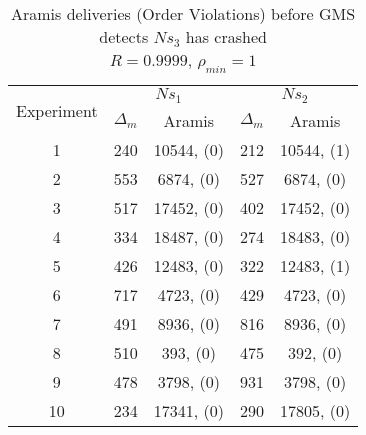 \begin{table}[p]
    \begin{center}
        \renewcommand{\arraystretch}{1.25}
        \begin{tabular}{|c|c|c|c|c|}
            \hline
            \multirow{2}{*}{Experiment} & \multicolumn{2}{|c|}{$Ns_1$} & \multicolumn{2}{|c|}{$Ns_2$} \\ \cline{2-5}
                                                       & $\Delta_m$&\textsf{Aramis} & $\Delta_m$&\textsf{Aramis} \\ \hline \hline
            1 & 240 & 10544, (0) & 212 & 10544, (1) \\ \hline
            2 & 553 & 6874, (0) & 527 & 6874, (0) \\ \hline
            3 & 517 & 17452, (0) & 402 & 17452, (0) \\ \hline
            4 & 334 & 18487, (0) & 274 & 18483, (0) \\ \hline
            5 & 426 & 12483, (0) & 322 & 12483, (1) \\ \hline
            6 & 717 & 4723, (0) & 429 & 4723, (0) \\ \hline
            7 & 491 & 8936, (0) & 816 & 8936, (0) \\ \hline
            8 & 510 & 393, (0) & 475 & 392, (0) \\ \hline
            9 & 478 & 3798, (0) & 931 & 3798, (0) \\ \hline
            10 & 234 & 17341, (0) & 290 & 17805, (0) \\  \hline
        \end{tabular}
        \caption[\textsf{Aramis} deliveries before GMS detects node crash ($R=0.9999$, $\rho_{min}=1$)]{\textsf{Aramis} deliveries (Order Violations) before GMS detects $Ns_3$ has crashed \\ $R=0.9999$, $\rho_{min}=1$}
        \label{table:crashed_node_rho1}
    \end{center}
\end{table}

